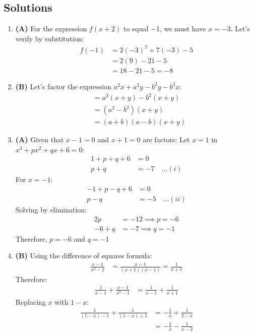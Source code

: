 \subsection{Solutions}
\begin{multicols}{2}
  \begin{enumerate}[label={\textbf{\arabic*.}}]
    \item \textbf{(A)} For the expression $f(x + 2)$ to equal $-1$, we must have $x = -3$.
      Let's verify by substitution:
      \begin{align*}
        f(-1) &= 2(-3)^2 + 7(-3) - 5 \\
        &= 2(9) - 21 - 5 \\
        &= 18 - 21 - 5 = -8
      \end{align*}

    \item \textbf{(B)} Let's factor the expression \(a^2x + a^2y - b^2y - b^2x\):
      \begin{align*}
        &= a^2(x + y) - b^2(x + y) \\
        &= (a^2 - b^2)(x + y) \\
        &= (a + b)(a - b)(x + y)
      \end{align*}

    \item \textbf{(A)} Given that $x - 1 = 0$ and $x + 1 = 0$ are factors:
      Let $x = 1$ in $x^3 + px^2 + qx + 6 = 0$:
      \begin{align*}
        1 + p + q + 6 &= 0 \\
        p + q &= -7 \quad ...(i)
      \end{align*}
      For $x = -1$:
      \begin{align*}
        -1 + p - q + 6 &= 0 \\
        p - q &= -5 \quad ...(ii)
      \end{align*}
      Solving by elimination:
      \begin{align*}
        2p &= -12 \implies p = -6 \\
        -6 + q &= -7 \implies q = -1
      \end{align*}
      Therefore, $p = -6$ and $q = -1$

    \item \textbf{(B)} Using the difference of squares formula:
      \begin{align*}
        \frac{x - 1}{x^2 - 1} &= \frac{x - 1}{(x+1)(x-1)} = \frac{1}{x + 1}
      \end{align*}
      Therefore:
      \begin{align*}
        \frac{1}{x - 1} + \frac{x - 1}{x^2 - 1} &= \frac{1}{x - 1} + \frac{1}{x + 1}
      \end{align*}
      Replacing $x$ with $1-x$:
      \begin{align*}
        \frac{1}{(1-x) - 1} + \frac{1}{(1-x) + 1} &= -\frac{1}{x} + \frac{1}{2-x} \\
        &= -\frac{1}{x} - \frac{1}{x - 2}
      \end{align*}


\end{enumerate}
\end{multicols}
